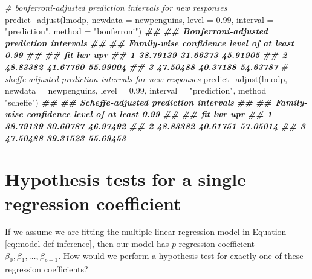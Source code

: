 \documentclass[
]{book}
\newenvironment{Shaded}{\begin{snugshade}}{\end{snugshade}}
\newcommand{\AttributeTok}[1]{\textcolor[rgb]{0.77,0.63,0.00}{#1}}
\newcommand{\CommentTok}[1]{\textcolor[rgb]{0.56,0.35,0.01}{\textit{#1}}}
\newcommand{\DocumentationTok}[1]{\textcolor[rgb]{0.56,0.35,0.01}{\textbf{\textit{#1}}}}
\newcommand{\FloatTok}[1]{\textcolor[rgb]{0.00,0.00,0.81}{#1}}
\newcommand{\FunctionTok}[1]{\textcolor[rgb]{0.00,0.00,0.00}{#1}}
\newcommand{\NormalTok}[1]{#1}
\newcommand{\StringTok}[1]{\textcolor[rgb]{0.31,0.60,0.02}{#1}}
\theoremstyle{definition}
\theoremstyle{definition}
\theoremstyle{definition}
\theoremstyle{definition}
\theoremstyle{remark}
\begin{document}
\begin{Shaded}
\begin{Highlighting}[]
\CommentTok{\# bonferroni{-}adjusted prediction intervals for new responses}
\FunctionTok{predict\_adjust}\NormalTok{(lmodp, }\AttributeTok{newdata =}\NormalTok{ newpenguins, }\AttributeTok{level =} \FloatTok{0.99}\NormalTok{,}
               \AttributeTok{interval =} \StringTok{"prediction"}\NormalTok{,}
               \AttributeTok{method =} \StringTok{"bonferroni"}\NormalTok{)}
\DocumentationTok{\#\# }
\DocumentationTok{\#\# Bonferroni{-}adjusted prediction intervals}
\DocumentationTok{\#\# }
\DocumentationTok{\#\# Family{-}wise confidence level of at least 0.99 }
\DocumentationTok{\#\# }
\DocumentationTok{\#\#        fit      lwr      upr}
\DocumentationTok{\#\# 1 38.79139 31.66373 45.91905}
\DocumentationTok{\#\# 2 48.83382 41.67760 55.99004}
\DocumentationTok{\#\# 3 47.50488 40.37188 54.63787}
\CommentTok{\# sheffe{-}adjusted prediction intervals for new responses}
\FunctionTok{predict\_adjust}\NormalTok{(lmodp, }\AttributeTok{newdata =}\NormalTok{ newpenguins, }\AttributeTok{level =} \FloatTok{0.99}\NormalTok{,}
               \AttributeTok{interval =} \StringTok{"prediction"}\NormalTok{,}
               \AttributeTok{method =} \StringTok{"scheffe"}\NormalTok{)}
\DocumentationTok{\#\# }
\DocumentationTok{\#\# Scheffe{-}adjusted prediction intervals}
\DocumentationTok{\#\# }
\DocumentationTok{\#\# Family{-}wise confidence level of at least 0.99 }
\DocumentationTok{\#\# }
\DocumentationTok{\#\#        fit      lwr      upr}
\DocumentationTok{\#\# 1 38.79139 30.60787 46.97492}
\DocumentationTok{\#\# 2 48.83382 40.61751 57.05014}
\DocumentationTok{\#\# 3 47.50488 39.31523 55.69453}
\end{Highlighting}
\end{Shaded}

\hypertarget{hypothesis-tests-for-a-single-regression-coefficient}{%
\section{Hypothesis tests for a single regression coefficient}\label{hypothesis-tests-for-a-single-regression-coefficient}}

If we assume we are fitting the multiple linear regression model in Equation \eqref{eq:model-def-inference}, then our model has \(p\) regression coefficient \(\beta_0, \beta_1, \ldots, \beta_{p-1}\). How would we perform a hypothesis test for exactly one of these regression coefficients?
\end{document}

